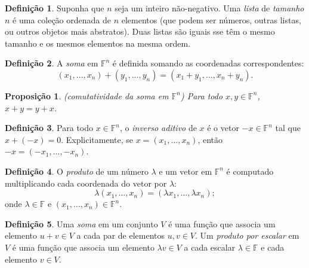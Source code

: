 \documentclass[12pt]{article}
\theoremstyle{plain}
\newtheorem{prop}[thm]{Proposição}
\theoremstyle{definition}
\newtheorem{defn}{Definição}[section]
\theoremstyle{remark}
\begin{document}
\begin{defn}
    Suponha que \(n\) seja um inteiro não-negativo. Uma \emph{lista} de \emph{tamanho} \(n\) é uma coleção ordenada de \(n\) elementos (que podem ser números, outras listas, ou outros objetos mais abstratos). Duas listas são iguais sse têm o mesmo tamanho e os mesmos elementos na mesma ordem.
\end{defn}

\begin{defn}
    A \emph{soma} em \(\mathbb{F}^n\) é definida somando as coordenadas correspondentes:
    \[
        (x_1, \ldots, x_n) + (y_1, \ldots, y_n) = (x_1 + y_1, \ldots, x_n + y_n).
    \]
\end{defn}

\begin{prop} (comutatividade da soma em \(\mathbb{F}^n\))
    Para todo \(x, y \in \mathbb{F}^n\), \(x + y = y + x\).
\end{prop}

\begin{defn}
    Para todo \(x \in \mathbb{F}^n\), o \emph{inverso aditivo} de \(x\) é o vetor \(-x \in \mathbb{F}^n\) tal que \(x + (-x) = 0\). Explicitamente, se \(x = (x_1, \ldots, x_n)\), então \(-x = (-x_1, \ldots, -x_n)\).
\end{defn}

\begin{defn}
    O \emph{produto} de um número \(\lambda\) e um vetor em \(\mathbb{F}^n\) é computado multiplicando cada coordenada do vetor por \(\lambda\):
    \[
        \lambda (x_1, \ldots, x_n) = (\lambda x_1, \ldots, \lambda x_n);
    \]
    \noindent onde \(\lambda \in \mathbb{F}\) e \((x_1, \ldots, x_n) \in \mathbb{F}^n\).
\end{defn}

\begin{defn}
    Uma \emph{soma} em um conjunto \(V\) é uma função que associa um elemento \(u + v \in V\) a cada par de elementos \(u, v \in V\). Um \emph{produto por escalar} em \(V\) é uma função que associa um elemento \(\lambda v \in V\) a cada escalar \(\lambda \in \mathbb{F}\) e cada elemento \(v \in V\). 
\end{defn}
\end{document}
